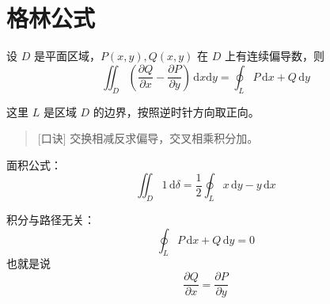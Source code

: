 \section{格林公式}

\begin{theorem}
    设 $D$ 是平面区域，$P(x,y),Q(x,y)$ 在 $D$ 上有连续偏导数，则
    \[
        \iint_{D} \left( \frac{\partial Q}{\partial x} - \frac{\partial P}{\partial y} \right) \, \mathrm{d}x \mathrm{d}y = \oint_{L} P \, \mathrm{d}x + Q \, \mathrm{d}y
    \]
\end{theorem}

这里 $L$ 是区域 $D$ 的边界，按照逆时针方向取正向。

\begin{quote}[口诀]
    交换相减反求偏导，交叉相乘积分加。
\end{quote}

面积公式：
\[
    \iint_{D} 1 \, \mathrm{d}\delta = \frac{1}{2} \oint_{L} x \, \mathrm{d}y - y \, \mathrm{d}x
\]

积分与路径无关：
\[
    \oint_{L} P \, \mathrm{d}x + Q \, \mathrm{d}y = 0
\]
也就是说
\[
    \frac{\partial Q}{\partial x} = \frac{\partial P}{\partial y}
\]